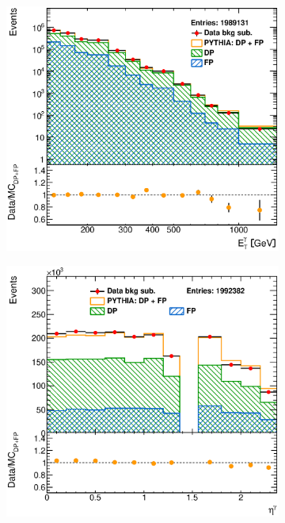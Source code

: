 \documentclass[12pt, twoside]{article}
\numberwithin{equation}{section}
\numberwithin{figure}{section}
\newenvironment{changemargin}[2]{%
\begin{list}{}{%
\setlength{\topsep}{0pt}%
\setlength{\leftmargin}{#1}%
\setlength{\rightmargin}{#2}%
\setlength{\listparindent}{\parindent}%
\setlength{\itemindent}{\parindent}%
\setlength{\parsep}{\parskip}%
}%
\item[]}{\end{list}}
\begin{document}
\begin{figure}
    \centering
    \checkoddpage
    \ifoddpage
        \begin{changemargin}{-1.0cm}{-0.75cm}
    \else
        \begin{changemargin}{-0.75cm}{-1.0cm}
    \fi
        \begin{subfigure}[b]{0.37\textwidth}
            \includegraphics[width=\textwidth]{./images/BackgroundSubtractedPythia/SIG_EVENTS-101.eps}
            \subcaption{}
            \label{fig:BSEtPhotonPYTHIA}
        \end{subfigure}
        \begin{subfigure}[b]{0.37\textwidth}
            \includegraphics[width=\textwidth]{./images/BackgroundSubtractedPythia/SIG_EVENTS-102.eps}

\end{subfigure}
\end{changemargin}
\end{changemargin}
\end{figure}
\end{document}
